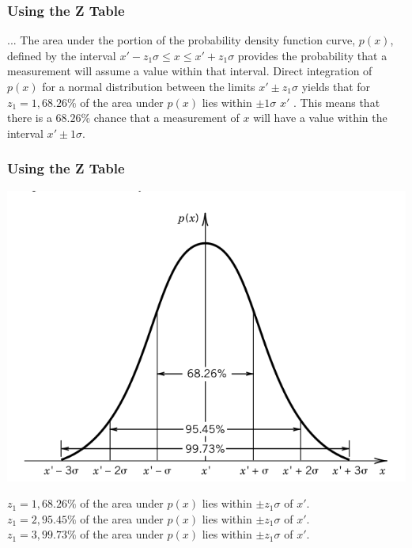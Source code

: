 \documentclass[fleqn]{beamer} %
\newcommand{\sectionIIsubsectionIIItitle}{Using the Z Table}
\begin{document}
			\begin{frame}
				\frametitle{\sectionIIsubsectionIIItitle}

				... The area under the portion of the probability density function curve, $p(x)$, defined by the interval $x'-z_1\sigma \leq x \leq x' +z_1\sigma$ provides the probability that a measurement will assume a value within that interval. Direct integration of $p(x)$ for a normal
				distribution between the limits $x'\pm z_1\sigma$ yields that for $z_1=1, 68.26\%$ of the area under $p(x)$ lies
				within $\pm 1\sigma$   $x'$ . This means that there is a $68.26\%$ chance that a measurement of $x$ will have a
				value within the interval $x'\pm 1\sigma$.
			
			\end{frame}		

			\begin{frame}
				\frametitle{\sectionIIsubsectionIIItitle}

				\bigskip


				\includegraphics[scale=.250]{images/topic2_fig4.png}
				
				$ z_1=1, 68.26\% $ of the area under $ p(x) $ lies within $ \pm z_1\sigma $ of $ x' $.\\ 
				$ z_1=2, 95.45\% $ of the area under $ p(x) $ lies within $ \pm z_1\sigma $ of $ x' $.\\ 
				$ z_1=3, 99.73\% $ of the area under $ p(x) $ lies within $ \pm z_1\sigma $ of $ x' $.\\ 		


			\end{frame}
\end{document}
